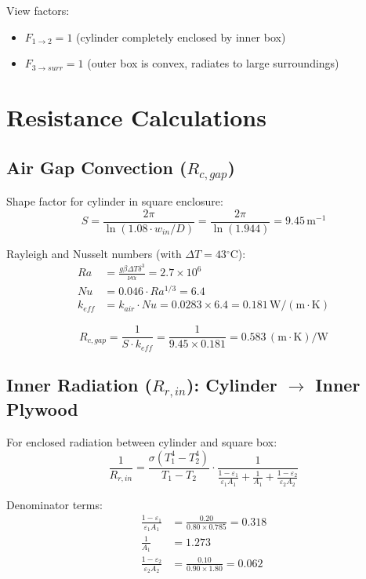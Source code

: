 \documentclass[11pt]{article}
\newcommand{\degC}{$^\circ$C}
\newcommand{\unit}[1]{\,\mathrm{#1}}
\begin{document}
View factors:
\begin{itemize}
    \item $F_{1 \to 2} = 1$ (cylinder completely enclosed by inner box)
    \item $F_{3 \to surr} = 1$ (outer box is convex, radiates to large surroundings)
\end{itemize}

\section{Resistance Calculations}

\subsection{Air Gap Convection ($R_{c,gap}$)}

Shape factor for cylinder in square enclosure:
\begin{equation}
    S = \frac{2\pi}{\ln(1.08 \cdot w_{in}/D)} = \frac{2\pi}{\ln(1.944)} = 9.45\unit{m^{-1}}
\end{equation}

Rayleigh and Nusselt numbers (with $\Delta T = 43$\degC):
\begin{align}
    Ra &= \frac{g\beta\Delta T \delta^3}{\nu\alpha} = 2.7 \times 10^6 \\
    Nu &= 0.046 \cdot Ra^{1/3} = 6.4 \\
    k_{eff} &= k_{air} \cdot Nu = 0.0283 \times 6.4 = 0.181\unit{W/(m \cdot K)}
\end{align}

\begin{equation}
    R_{c,gap} = \frac{1}{S \cdot k_{eff}} = \frac{1}{9.45 \times 0.181} = \boxed{0.583\unit{(m \cdot K)/W}}
\end{equation}

\subsection{Inner Radiation ($R_{r,in}$): Cylinder $\to$ Inner Plywood}

For enclosed radiation between cylinder and square box:
\begin{equation}
    \frac{1}{R_{r,in}} = \frac{\sigma(T_1^4 - T_2^4)}{T_1 - T_2} \cdot \frac{1}{\displaystyle\frac{1-\varepsilon_1}{\varepsilon_1 A_1} + \frac{1}{A_1} + \frac{1-\varepsilon_2}{\varepsilon_2 A_2}}
\end{equation}

Denominator terms:
\begin{align}
    \frac{1-\varepsilon_1}{\varepsilon_1 A_1} &= \frac{0.20}{0.80 \times 0.785} = 0.318 \\
    \frac{1}{A_1} &= 1.273 \\
    \frac{1-\varepsilon_2}{\varepsilon_2 A_2} &= \frac{0.10}{0.90 \times 1.80} = 0.062
\end{align}
\end{document}
